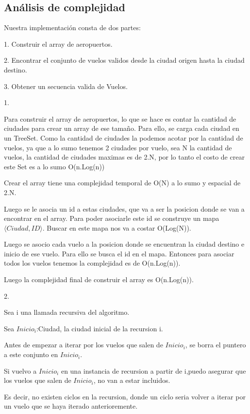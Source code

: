 \newpage

\subsection{Análisis de complejidad}
Nuestra implementaci\'on consta de dos partes:

1. Construir el array de aeropuertos.

2. Encontrar el conjunto de vuelos validos desde la ciudad origen hasta la ciudad destino.

3. Obtener un secuencia valida de Vuelos.

1.

Para construir el array de aeropuertos, lo que se hace es contar la cantidad de ciudades para crear un array de ese tamaño.
Para ello, se carga cada ciudad en un TreeSet. Como la cantidad de ciudades la podemos acotar por la cantidad de vuelos, ya que a lo sumo tenemos 2 ciudades por vuelo, sea N la cantidad de vuelos, la cantidad de ciudades maximas es de 2.N, por lo tanto el costo de crear este Set es a lo sumo O(n.Log(n))

Crear el array tiene una complejidad temporal de O(N) a lo sumo y espacial de 2.N.

Luego se le asocia un id a estas ciudades, que va a ser la posicion donde se van a encontrar en el array. Para poder asociarle este id se construye un mapa $\langle Ciudad,ID \rangle$.
Buscar en este mapa nos va a costar O(Log(N)).

Luego se asocio cada vuelo a la posicion donde se encuentran la ciudad destino e inicio de ese vuelo.
Para ello se busca el id en el mapa. Entonces para asociar todos los vuelos tenemos la complejidad es de O(n.Log(n)).

Luego la complejidad final de construir el array es O(n.Log(n)).

2.

Sea i una llamada recursiva del algoritmo.

Sea $Inicio_{i}$:Ciudad, la ciudad inicial de la recursion i.



Antes de empezar a iterar por los vuelos que salen de $Inicio_{i}$, se borra el puntero a este conjunto en $Inicio_{i}$.

Si vuelvo a $Inicio_{i}$ en una instancia de recursion a partir de i,puedo asegurar que los vuelos que salen de $Inicio_{i}$, no van a estar incluidos.

Es decir, no existen ciclos en la recursion, donde un ciclo seria volver a iterar por un vuelo que se haya iterado anterioremente.


